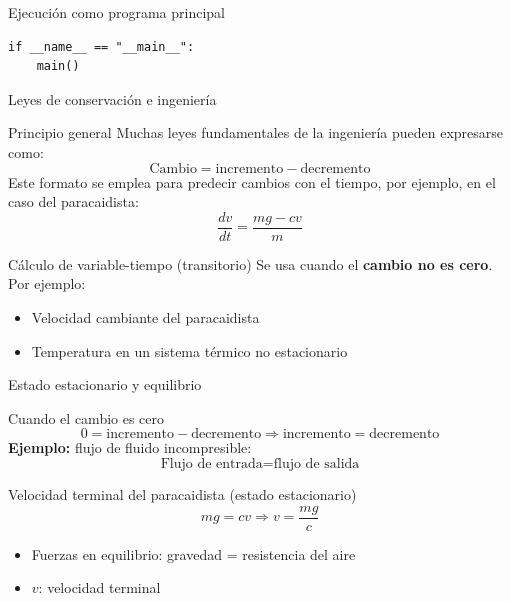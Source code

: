 \documentclass[main.tex]{subfiles}
\begin{document}
\begin{frame}[fragile]{Ejecución como programa principal}
\begin{lstlisting}[style=mypython]
if __name__ == "__main__":
    main()
\end{lstlisting}
\end{frame}



\begin{frame}[c]{Leyes de conservación e ingeniería}
\begin{block}{Principio general}
Muchas leyes fundamentales de la ingeniería pueden expresarse como:
\[
\text{Cambio} = \text{incremento} - \text{decremento} 
\]
Este formato se emplea para predecir cambios con el tiempo, por ejemplo, en el caso del paracaidista:
\[
\frac{dv}{dt} = \frac{mg - cv}{m}
\]
\end{block}

\begin{block}{Cálculo de variable-tiempo (transitorio)}
\medskip
Se usa cuando el \textbf{cambio no es cero}. Por ejemplo:
\begin{itemize}
  \item Velocidad cambiante del paracaidista
  \item Temperatura en un sistema térmico no estacionario
\end{itemize}
\end{block}
\end{frame}

\begin{frame}[c]{Estado estacionario y equilibrio}
\begin{block}{Cuando el cambio es cero}
\[
0 = \text{incremento} - \text{decremento} \Rightarrow \text{incremento} = \text{decremento}
\]
\textbf{Ejemplo:} flujo de fluido incompresible:
\[
\text{Flujo de entrada} = \text{flujo de salida}
\]
\end{block}

\begin{block}{Velocidad terminal del paracaidista (estado estacionario)}
\[
mg = cv \Rightarrow v = \frac{mg}{c}
\]
\begin{itemize}
  \item Fuerzas en equilibrio: gravedad = resistencia del aire
  \item \(v\): velocidad terminal
\end{itemize}
\end{block}
\end{frame}
\end{document}
